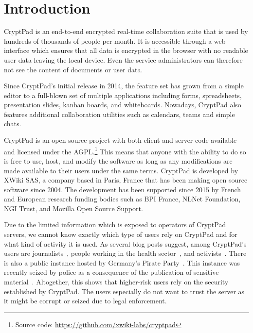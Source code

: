 \section{Introduction}

CryptPad is an end-to-end encrypted real-time collaboration suite that is used by hundreds of thousands of people per month.
It is accessible through a web interface which ensures that all data is encrypted in the browser with no readable user data leaving the local device.
Even the service administrators can therefore not see the content of documents or user data.


Since CryptPad's initial release in 2014, the feature set has grown from a simple editor to a full-blown set of multiple applications including forms, spreadsheets, presentation slides, kanban boards, and whiteboards.
Nowadays, CryptPad also features additional collaboration utilities such as calendars, teams and simple chats.

CryptPad is an open source project with both client and server code available and licensed under the \ac{AGPL}.\footnote{Source code: \url{https://github.com/xwiki-labs/cryptpad}}
This means that anyone with the ability to do so is free to use, host, and modify the software as long as any modifications are made available to their users under the same terms.
CryptPad is developed by XWiki SAS, a company based in Paris, France that has been making open source software since 2004.
The development has been supported since 2015 by French and European research funding bodies such as BPI France, NLNet Foundation, NGI Trust, and Mozilla Open Source Support.

Due to the limited information which is exposed to operators of CryptPad servers, we cannot know exactly which type of users rely on CryptPad and for what kind of activity it is used.
As several blog posts suggest, among CryptPad's users are journalists~\cite{Jha2022}, people working in the health sector~\cite{InterHop2021}, and activists~\cite{Times2022,Paris2019}.
There is also a public instance hosted by Germany's Pirate Party~\cite{PPG}.
This instance was recently seized by police as a consequence of the publication of sensitive material~\cite{Times2022}.
Altogether, this shows that higher-risk users rely on the security established by CryptPad.
The users especially do not want to trust the server as it might be corrupt or seized due to legal enforcement.

